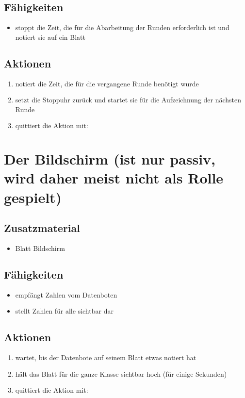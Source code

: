 \documentclass[a4paper]{kinet-intern}
\begin{document}
\subsection*{Fähigkeiten}
\begin{itemize}
	\item stoppt die Zeit, die für die Abarbeitung der Runden erforderlich ist und notiert sie auf ein Blatt
\end{itemize}

\subsection*{Aktionen}
\begin{enumerate}
	\item notiert die Zeit, die für die vergangene Runde benötigt wurde
	\item setzt die Stoppuhr zurück und startet sie für die Aufzeichnung der nächsten Runde
	\item quittiert die Aktion mit: 
\end{enumerate}


\vspace{2cm}
\section*{Der Bildschirm (ist nur passiv, wird daher meist nicht als Rolle gespielt)}

\subsection*{Zusatzmaterial}
\begin{itemize}
	\item Blatt \dq{}Bildschirm\dq{}
\end{itemize}

\subsection*{Fähigkeiten}
\begin{itemize}
	\item empfängt Zahlen vom Datenboten
	\item stellt Zahlen für alle sichtbar dar
\end{itemize}

\subsection*{Aktionen}
\begin{enumerate}
	\item wartet, bis der Datenbote auf seinem Blatt etwas notiert hat
	\item hält das Blatt für die ganze Klasse sichtbar hoch (für einige Sekunden)
	\item quittiert die Aktion mit: 
\end{enumerate}
\end{document}
